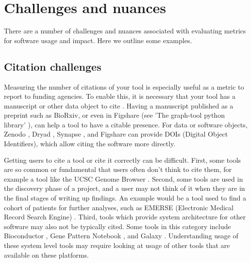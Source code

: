 \documentclass{article}
\begin{document}
\section{Challenges and nuances}

There are a number of challenges and nuances associated with evaluating metrics for software usage and impact. Here we outline some examples.

\subsection{Citation challenges}
Measuring the number of citations of your tool is especially useful as a metric to report to funding agencies. To enable this, it is necessary that your tool has a manuscript or other data object to cite \cite{chue_hong_software_2019}. Having a manuscript published as a preprint such as BioRxiv, or even in Figshare (see 'The graph-tool python library' \cite{peixoto_graph-tool_2017}), can help a tool to have a citable presence. For data or software objects, Zenodo \cite{zenodo}, Dryad \cite{datadryad}, Synapse \cite{synapse}, and Figshare \cite{figshare} can provide DOIs (Digital Object Identifiers), which allow citing the software more directly. 

Getting users to cite a tool or cite it correctly can be difficult. First, some tools are so common or fundamental that users often don't think to cite them, for example a tool like the UCSC Genome Browser \cite{ucsc, kent_human_2002}. Second, some tools are used in the discovery phase of a project, and a user may not think of it when they are in the final stages of writing up findings. An example would be a tool used to find a cohort of patients for further analyses, such as EMERSE (Electronic Medical Record Search Engine) \cite{hanauer_supporting_2015}. Third, tools which provide system architecture for other software may also not be typically cited. Some tools in this category include Bioconductor \cite{bioconductor}, Gene Pattern Notebook \cite{reich_genepattern_2017}, and Galaxy \cite{the_galaxy_community_galaxy_2022}. Understanding usage of these system level tools may require looking at usage of other tools that are available on these platforms.   
\end{document}
